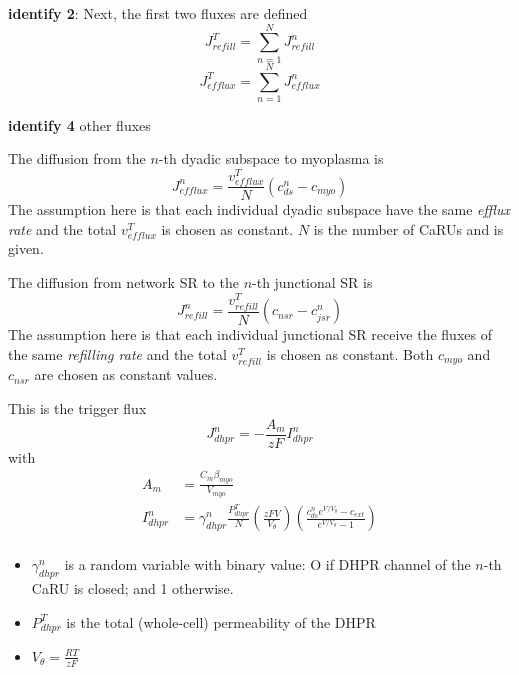{\bf identify 2}: Next, the first two fluxes are defined
\begin{equation}
  \label{eq:169}
  J^T_{refill} = \sum_{n=1}^N J^n_{refill}
\end{equation}
\begin{equation}
  \label{eq:170}
  J^T_{efflux} = \sum_{n=1}^N J^n_{efflux}
\end{equation}

{\bf identify 4} other fluxes

The diffusion from the $n$-th dyadic subspace to myoplasma is
\begin{equation}
  \label{eq:175}
  J^n_{efflux} =  \frac{v^T_{efflux}}{N} (c^n_{ds} - c_{myo})
\end{equation}
The assumption here is that each individual dyadic subspace have the
same {\it efflux rate} and the total $v^T_{efflux}$ is chosen as
constant.  $N$ is the number of CaRUs and is given.

The diffusion from network SR to the $n$-th junctional SR is
\begin{equation}
  \label{eq:176}
  J^n_{refill} =  \frac{v^T_{refill}}{N} (c_{nsr} - c^n_{jsr})
\end{equation}
The assumption here is that each individual junctional SR receive the
 fluxes of the same {\it refilling rate} and the total
$v^T_{refill}$ is chosen as constant.  
Both $c_{myo}$ and $c_{nsr}$ are chosen as constant values. 

This is the trigger  flux
\begin{equation}
  \label{eq:172}
  J^n_{dhpr} = - \frac{A_m}{zF} I^n_{dhpr}
\end{equation}
with 
\begin{equation}
  \label{eq:173}
  \begin{split}
    A_m &= \frac{C_m \beta_{myo}}{V_{myo}}\\
    I^n_{dhpr} &= \gamma^n_{dhpr}\frac{P^T_{dhpr}}{N}\left(
      \frac{zFV}{V_\theta}\right) \left( \frac{c^n_{ds}e^{V/V_\theta}-c_{ext}}{e^{V/V_\theta}-1}  \right)\\
  \end{split}
\end{equation}
\begin{itemize}
\item $\gamma^n_{dhpr}$ is a random variable with binary value: O if
  DHPR channel of the $n$-th CaRU is closed; and 1 otherwise.
\item $P^T_{dhpr}$ is the total (whole-cell) permeability of the DHPR
\item $V_\theta = \frac{RT}{zF}$
\end{itemize}

